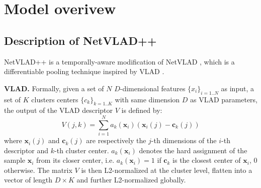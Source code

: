 \documentclass{article}
\begin{document}
\section{Model overivew}
\subsection{Description of NetVLAD++}
NetVLAD++ \cite{nv++} is a temporally-aware modification of NetVLAD \cite{netvlad}, which is a differentiable pooling technique inspired by VLAD \cite{vlad}.

\textbf{VLAD.} Formally, given a set of $N$ $D$-dimensional features $\{x_i\}_{i=1..N}$ as input, a set of $K$ clusters centers $\{c_k\}_{k=1..K}$ with same dimension $D$ as VLAD parameters, the output of the VLAD descriptor $V$ is defined by:
\begin{equation}
\label{eq1}
    V(j, k) = \sum_{i=1}^Na_k(\mathrm{\mathbf{x}}_i)(\mathrm{\mathbf{x}}_i(j)-\mathrm{\mathbf{c}}_k(j))
\end{equation}
where $\mathrm{\mathbf{x}}_i(j)$ and $\mathrm{\mathbf{c}}_k(j)$ are respectively the $j$-th dimensions of the $i$-th descriptor and $k$-th cluster center. $a_k(\mathrm{\mathbf{x}}_i)$ denotes the hard assignment of the sample $\mathrm{\mathbf{x}}_i$ from its closer center, i.e. $a_k(\mathrm{\mathbf{x}}_i) = 1$ if $\mathrm{\mathbf{c}}_k$ is the closest center of $\mathrm{\mathbf{x}}_i$, 0 otherwise. The matrix $V$ is then L2-normalized at the cluster level, flatten into a vector of length $D \times K$ and further L2-normalized globally.
\end{document}
